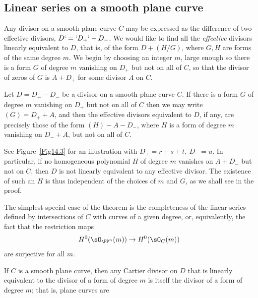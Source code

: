\subsection{Linear series on a smooth plane curve}\label{linear series on smooth plane curves}

Any divisor on a smooth plane curve $C$ may be expressed as the difference of
%
two 
effective divisors,
$D`=` D_{+}`-\nobreak D_{-}$. We would like to find all the \emph{effective} divisors 
%
linearly equivalent
to $D$, that is, of the form
$D + (H/G)$, where $G, H$ are forms of the same degree $m$. We begin by choosing
an integer $m$, large enough so there is a form $G$ of degree $m$ vanishing on $D_+$ but not on all of $C$, so
that the divisor of zeros of $G$ is $A+D_+$ for some divisor $A$ on $C$.

\begin{theorem}\label{equiv on smooth plane curve}
Let $D= D_{+}-D_{-}$ be a divisor on 
a
smooth plane curve $C$. If
there is a form $G$ of degree $m$ vanishing on $D_{+}$ but not on all of $C$
then we may write $(G) = D_{+}+A$, and then
the effective divisors equivalent to $D$, if any, are precisely those 
of the form $(H) - A -D_{-}$, where $H$
is a form of degree $m$ vanishing on $D_{-}+A$, but not on all of $C$.
\end{theorem}

See Figure~\ref{Fig14.3} for an illustration with $D_+ = r+s+t, \ D_- = u$.
In particular, if no homogeneous polynomial $H$ of degree $m$ vanishes on  $A + D_{-}$ but not on $C$, then $D$ is not linearly equivalent to any effective divisor. The existence of such an $H$ is thus independent of the choices of $m$ and $G$, as we shall see in the proof.

The simplest special case of the theorem is the completeness
%
of the linear series defined
by intersections of $C$ with curves of a given degree, 
or, equivalently, the fact that the restriction maps
$$
H^{0}(\sO_{\PP^{n}}(m)) \to H^{0}(\sO_{C}(m))
$$
are surjective for all $m$. 

\begin{proposition}\label {completeness of hyperplanes on plane curve}
If $C$ is a smooth plane curve, then any Cartier divisor on $D$ that is linearly equivalent to the divisor of
a form of degree $m$ is itself the divisor of a form of degree $m$; that is, plane curves are
%
\end{proposition}

